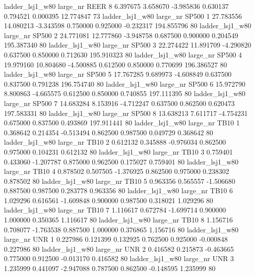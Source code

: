     ladder_lsj1_w80   large_nr     REER                 8  6.397675  3.658670  -3.985836 0.630137 0.794521  0.000395   12.774847 73
    ladder_lsj1_w80   large_nr    SP500                 1 27.783556 14.080213  -3.343598 0.750000 0.925000 -0.232317  194.855796 80
    ladder_lsj1_w80   large_nr    SP500                 2 24.771081 12.777860  -3.948758 0.687500 0.900000  0.204549  195.387340 80
    ladder_lsj1_w80   large_nr    SP500                 3 22.274422 11.891709  -4.290820 0.637500 0.850000  0.712630  195.910323 80
    ladder_lsj1_w80   large_nr    SP500                 4 19.979160 10.804680  -4.500885 0.612500 0.850000  0.770699  196.386527 80
    ladder_lsj1_w80   large_nr    SP500                 5 17.767285  9.689973  -4.608849 0.637500 0.837500  0.791238  196.754740 80
    ladder_lsj1_w80   large_nr    SP500                 6 15.972790  8.800863  -4.665575 0.612500 0.850000  0.740855  197.111395 80
    ladder_lsj1_w80   large_nr    SP500                 7 14.683284  8.153916  -4.712247 0.637500 0.862500  0.620473  197.583331 80
    ladder_lsj1_w80   large_nr    SP500                 8 13.638213  7.611717  -4.754231 0.675000 0.837500  0.493869  197.911441 80
    ladder_lsj1_w80   large_nr     TB10                 1  0.368642  0.214354  -0.513494 0.862500 0.987500  0.049729    0.368642 80
    ladder_lsj1_w80   large_nr     TB10                 2  0.612132  0.345888  -0.976034 0.862500 0.975000  0.104231    0.612132 80
    ladder_lsj1_w80   large_nr     TB10                 3  0.759401  0.433060  -1.207787 0.875000 0.962500  0.175027    0.759401 80
    ladder_lsj1_w80   large_nr     TB10                 4  0.878502  0.507505  -1.376925 0.862500 0.975000  0.238302    0.878502 80
    ladder_lsj1_w80   large_nr     TB10                 5  0.963356  0.565557  -1.506680 0.887500 0.987500  0.283778    0.963356 80
    ladder_lsj1_w80   large_nr     TB10                 6  1.029296  0.616561  -1.609848 0.900000 0.987500  0.318021    1.029296 80
    ladder_lsj1_w80   large_nr     TB10                 7  1.116617  0.672784  -1.699714 0.900000 1.000000  0.350365    1.116617 80
    ladder_lsj1_w80   large_nr     TB10                 8  1.156716  0.708077  -1.763538 0.887500 1.000000  0.376865    1.156716 80
    ladder_lsj1_w80   large_nr      UNR                 1  0.227986  0.121399   0.132925 0.762500 0.925000 -0.000848    0.227986 80
    ladder_lsj1_w80   large_nr      UNR                 2  0.416582  0.215873  -0.463665 0.775000 0.912500 -0.013170    0.416582 80
    ladder_lsj1_w80   large_nr      UNR                 3  1.235999  0.441097  -2.947088 0.787500 0.862500 -0.148595    1.235999 80
